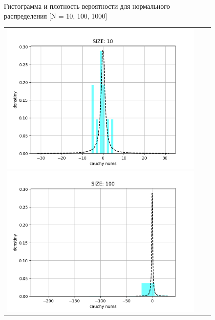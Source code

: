 \begin{itemize}
\begin{figure}[H]
\begin{tabular}{ccc}
		\end{tabular}
		\caption{Гистограмма и плотность вероятности для нормального распределения [N = 10, 100, 1000]} 
	\end{figure}
	
	\begin{figure}[H]
		\begin{tabular}{ccc}
			\includegraphics[scale=0.333]{task_1/resource/cauchy10.png}
			\includegraphics[scale=0.333]{task_1/resource/cauchy100.png}

\end{tabular}
\end{figure}
\end{itemize}
